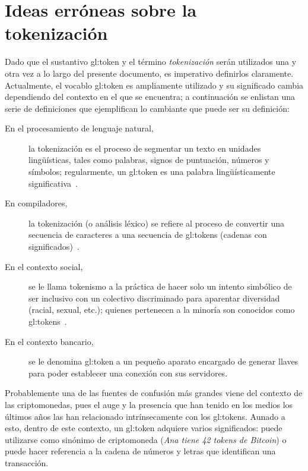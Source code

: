 %
%
%

\section{Ideas erróneas sobre la tokenización}

Dado que el sustantivo \gls{gl:token} y el término \textit{tokenización} serán
utilizados una y otra vez a lo largo del presente documento, es imperativo
definirlos claramente. Actualmente, el vocablo \gls{gl:token} es ampliamente
utilizado y su significado cambia dependiendo del contexto en el que se
encuentra; a continuación se enlistan una serie de definiciones que
ejemplifican lo cambiante que puede ser su definición:
\begin{description}
  \item [En el procesamiento de lenguaje natural,] la tokenización es el proceso
    de segmentar un texto en unidades lingüísticas, tales como palabras, signos
    de puntuación, números y símbolos; regularmente, un \gls{gl:token} es una
    palabra lingüísticamente significativa~\cite{miscon_nlp}.
  \item [En compiladores,] la tokenización (o análisis léxico) se refiere al
    proceso de convertir una secuencia de caracteres a una secuencia de
    \glspl{gl:token} (cadenas con significados)~\cite{miscon_comp}.
  \item [En el contexto social,] se le llama tokenismo a la práctica de hacer
    solo un intento simbólico de ser inclusivo con un colectivo discriminado
    para aparentar diversidad (racial, sexual, etc.); quienes pertenecen a la
    minoría son conocidos como \glspl{gl:token}~\cite{miscon_soc}.
  \item [En el contexto bancario,] se le denomina \gls{gl:token} a un pequeño
    aparato encargado de generar llaves para poder establecer una conexión con
    sus servidores.
\end{description}
Probablemente una de las fuentes de confusión más grandes viene del contexto
de las criptomonedas, pues el auge y la presencia que han tenido en los medios
los últimos años las han relacionado intrínsecamente con los \glspl{gl:token}.
Aunado a esto, dentro de este contexto, un \gls{gl:token} adquiere varios
significados: puede utilizarse como sinónimo de criptomoneda (\textit{Ana %
tiene 42 tokens de Bitcoin}) o puede hacer referencia a la cadena de números y
letras que identifican una transacción.

